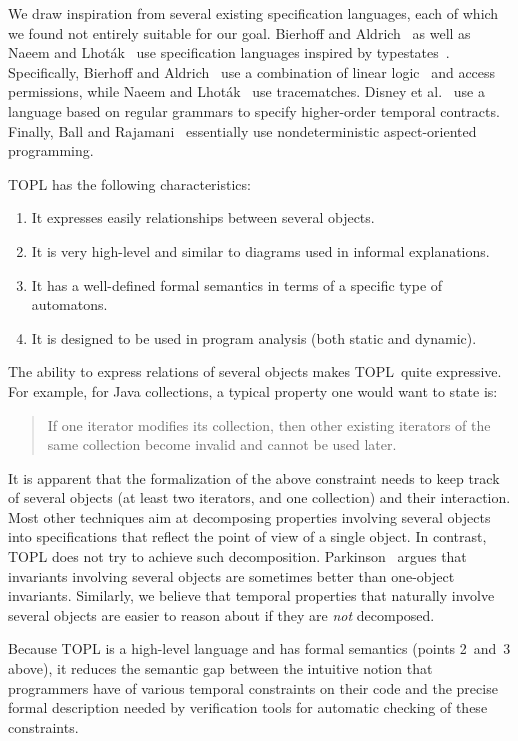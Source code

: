 \documentclass[preprint]{sigplanconf} %
\newcommand{\TPL}{TOPL}
\theoremstyle{definition}
\theoremstyle{remark}
\begin{document}
We draw inspiration from several existing specification languages, each of which we found not entirely suitable for our goal.
Bierhoff and Aldrich~\cite{dblp:conf/oopsla/bierhoffa07} as well as Naeem and Lhot\'ak~\cite{dblp:conf/oopsla/naeeml08} use specification languages inspired by typestates~\cite{strom1986}.
Specifically, Bierhoff and Aldrich~\cite{dblp:conf/oopsla/bierhoffa07} use a combination of linear logic~\cite{dblp:journals/tcs/girard87} and access permissions, while Naeem and Lhot\'ak~\cite{dblp:conf/oopsla/naeeml08} use tracematches.
Disney et al.~\cite{disney2011} use a language based on regular grammars to specify higher-order temporal contracts.
Finally, Ball and Rajamani~\cite{ball2002} essentially use nondeterministic aspect-oriented programming.

TOPL has the following characteristics:
\begin{enumerate}
\item It expresses easily relationships between several objects.
\item It is very high-level and similar to diagrams used in informal explanations.
\item It has a well-defined formal semantics in terms of a specific type of automatons.
\item It is designed to be used in program analysis (both static and dynamic).
\end{enumerate}
The ability to express relations of several objects makes \TPL\ quite expressive.
For example, for Java collections, a typical property one would want to state is:
\begin{quote}
If one iterator modifies its collection, then other existing iterators of the same collection become invalid and cannot be used later.
\end{quote}
\noindent
It is apparent that the formalization of the above constraint needs to keep track of several objects (at least two iterators, and one collection) and their interaction.
Most other techniques aim at decomposing properties involving several objects into specifications that reflect the point of view of a single object.
In contrast, TOPL does not try to achieve such decomposition.
Parkinson~\cite{parkinson-iwaco2007} argues that invariants involving several objects are sometimes better than one-object invariants.
Similarly, we believe that temporal properties that naturally involve several objects are easier to reason about if they are \emph{not} decomposed.

Because TOPL is a high-level language and has formal semantics (points 2~and~3 above), it reduces the semantic gap between the intuitive notion that programmers have of various temporal constraints on their code and the precise formal description needed by verification tools for automatic checking of these constraints.
\end{document}
